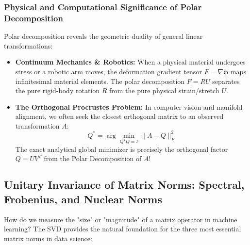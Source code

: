 \subsubsection{Physical and Computational Significance of Polar Decomposition}
Polar decomposition reveals the geometric duality of general linear transformations:
\begin{itemize}
    \item \textbf{Continuum Mechanics \& Robotics:} When a physical material undergoes stress or a robotic arm moves, the deformation gradient tensor $F = \nabla \boldsymbol{\phi}$ maps infinitesimal material elements. The polar decomposition $F = R U$ separates the pure rigid-body rotation $R$ from the pure physical strain/stretch $U$.
    \item \textbf{The Orthogonal Procrustes Problem:} In computer vision and manifold alignment, we often seek the closest orthogonal matrix to an observed transformation $A$:
    \begin{equation}
    Q^* = \arg\min_{Q^T Q = I} \|A - Q\|_F^2
    \end{equation}
    The exact analytical global minimizer is precisely the orthogonal factor $Q = U V^T$ from the Polar Decomposition of $A$!
\end{itemize}

\subsection{Unitary Invariance of Matrix Norms: Spectral, Frobenius, and Nuclear Norms}
How do we measure the "size" or "magnitude" of a matrix operator in machine learning?
The SVD provides the natural foundation for the three most essential matrix norms in data science:

